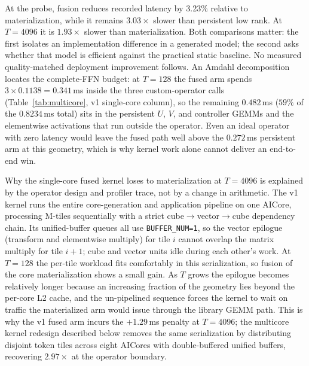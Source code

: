 At the probe, fusion reduces recorded latency by 3.23\% relative to
materialization, while it remains $3.03\times$ slower than persistent low rank.
At $T=4096$ it is $1.93\times$ slower than materialization. Both comparisons
matter: the first isolates an implementation difference in a generated model;
the second asks whether that model is efficient against the practical static
baseline. No measured quality-matched deployment improvement follows.
An Amdahl decomposition locates the complete-FFN budget: at $T{=}128$ the
fused arm spends $3\times0.1138=0.341$\,ms inside the three custom-operator
calls (Table~\ref{tab:multicore}, v1 single-core column), so the remaining
$0.482$\,ms ($59\%$ of the $0.8234$\,ms total) sits in the persistent
$U$, $V$, and controller GEMMs and the elementwise activations that run
outside the operator. Even an ideal operator with zero latency would leave
the fused path well above the $0.272$\,ms persistent arm at this geometry,
which is why kernel work alone cannot deliver an end-to-end win.

Why the single-core fused kernel loses to materialization at $T=4096$
is explained by the operator design and profiler trace, not by a change
in arithmetic. The v1 kernel runs the entire core-generation and
application pipeline on one AICore, processing M-tiles sequentially with
a strict cube$\to$vector$\to$cube dependency chain. Its unified-buffer
queues all use \texttt{BUFFER\_NUM=1}, so the vector epilogue
(transform and elementwise multiply) for tile $i$ cannot overlap the
matrix multiply for tile $i+1$; cube and vector units idle during each
other's work. At $T{=}128$ the per-tile workload fits comfortably in
this serialization, so fusion of the core materialization shows a small
gain. As $T$ grows the epilogue becomes relatively longer because an
increasing fraction of the geometry lies beyond the per-core L2 cache,
and the un-pipelined sequence forces the kernel to wait on traffic the
materialized arm would issue through the library GEMM path. This is why
the v1 fused arm incurs the $+1.29$\,ms penalty at $T{=}4096$; the
multicore kernel redesign described below removes the same
serialization by distributing disjoint token tiles across eight AICores
with double-buffered unified buffers, recovering $2.97\times$ at the
operator boundary.

